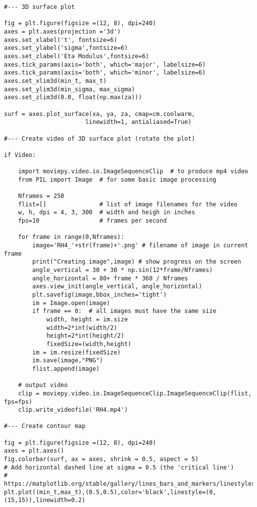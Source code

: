 \documentclass[oneside,10pt]{book}
\begin{document}
\begin{lstlisting}
#--- 3D surface plot

fig = plt.figure(figsize =(12, 8), dpi=240)
axes = plt.axes(projection ='3d')
axes.set_xlabel('t', fontsize=6)
axes.set_ylabel('sigma',fontsize=6)
axes.set_zlabel('Eta Modulus',fontsize=6)
axes.tick_params(axis='both', which='major', labelsize=6)
axes.tick_params(axis='both', which='minor', labelsize=6)
axes.set_xlim3d(min_t, max_t)
axes.set_ylim3d(min_sigma, max_sigma)
axes.set_zlim3d(0.0, float(np.max(za)))

surf = axes.plot_surface(xa, ya, za, cmap=cm.coolwarm,
                       linewidth=1, antialiased=True)

#--- Create video of 3D surface plot (rotate the plot)

if Video:

    import moviepy.video.io.ImageSequenceClip  # to produce mp4 video
    from PIL import Image  # for some basic image processing

    Nframes = 250
    flist=[]               # list of image filenames for the video
    w, h, dpi = 4, 3, 300  # width and heigh in inches
    fps=10                 # frames per second

    for frame in range(0,Nframes):
        image='RH4_'+str(frame)+'.png' # filename of image in current frame
        print("Creating image",image) # show progress on the screen
        angle_vertical = 30 + 30 * np.sin(12*frame/Nframes)
        angle_horizontal = 80+ frame * 360 / Nframes
        axes.view_init(angle_vertical, angle_horizontal)
        plt.savefig(image,bbox_inches='tight')
        im = Image.open(image)
        if frame == 0:  # all images must have the same size
            width, height = im.size
            width=2*int(width/2)
            height=2*int(height/2)
            fixedSize=(width,height)
        im = im.resize(fixedSize)
        im.save(image,"PNG")
        flist.append(image)

    # output video
    clip = moviepy.video.io.ImageSequenceClip.ImageSequenceClip(flist, fps=fps)
    clip.write_videofile('RH4.mp4')

#--- Create contour map

fig = plt.figure(figsize =(12, 8), dpi=240)
axes = plt.axes()
fig.colorbar(surf, ax = axes, shrink = 0.5, aspect = 5)
# Add horizontal dashed line at sigma = 0.5 (the 'critical line')
#     https://matplotlib.org/stable/gallery/lines_bars_and_markers/linestyles.html
plt.plot((min_t,max_t),(0.5,0.5),color='black',linestyle=(0,(15,15)),linewidth=0.2)


\end{lstlisting}
\end{document}
